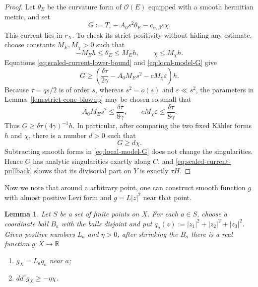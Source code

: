 \documentclass[reqno]{amsart}
\theoremstyle{remark}
\def\R{\mathbb{R}}
\newcommand{\ddc}{dd^c}
\newcommand{\cab}{c_{\alpha,\beta}}
\def\cO{{\mathcal O}}
\theoremstyle{plain}
\newtheorem{lemma}[thm]{Lemma}
\begin{document}
\begin{proof}
Let $\theta_E$ be the curvature form of $\cO(E)$ equipped with a smooth hermitian metric, and set
\begin{equation}\label{eq:local-model-G}
 G:=T_\tau-A_0s^2\theta_E-\cab\varepsilon\chi.
\end{equation}
This current lies in $r_X$.  To check its strict positivity without
hiding any estimate, choose constants $M_E,M_\chi>0$ such that
\[
 -M_Eh\leq\theta_E\leq M_Eh,
 \qquad
 \chi\leq M_\chi h.
\]
Equations \eqref{eq:scaled-current-lower-bound} and
\eqref{eq:local-model-G} give
\[
 G\geq
 \left(
  \frac{\delta\tau}{2\gamma}
  -A_0M_Es^2-cM_\chi\varepsilon
 \right)h.
\]
Because $\tau=qs/2$ is of order $s$, whereas
$s^2=o(s)$ and $\varepsilon\ll s^2$, the parameters in
Lemma~\ref{lem:strict-cone-blowup} may be chosen so small that
\[
 A_0M_Es^2\leq\frac{\delta\tau}{8\gamma},
 \qquad
 cM_\chi\varepsilon\leq\frac{\delta\tau}{8\gamma}.
\]
Thus $G\geq\delta\tau(4\gamma)^{-1}h$.  In particular, after
comparing the two fixed K\"ahler forms $h$ and $\chi$, there is a
number $d>0$ such that
\begin{equation}\label{eq:G-positive-lower-bound}
 G\geq d\chi.
\end{equation}
Subtracting smooth forms in \eqref{eq:local-model-G} does not change
the singularities.  Hence $G$ has analytic singularities
exactly along $C$, and \eqref{eq:scaled-current-pullback} shows that
its divisorial part on $Y$ is exactly $\tau H$.
\end{proof}


Now we note that around a arbitrary point, one can construct smooth function $g$ with almost positive Levi form and $g=L|z|^2$ near that point. 
\begin{lemma}
\label{lem:common-trace}
Let $S$ be a set of finite points on $X$. For each $a\in S$, choose a coordinate ball $B_a$ with the balls disjoint and put $q_a(z):=|z_1|^2+|z_2|^2+|z_3|^2.$ 
Given positive numbers $L_a$ and $\eta>0$, after shrinking
the $B_a$ there is a real function $g:X\to \R$
\begin{enumerate}[label=\textup{(\roman*)}]
\item $g_X=L_aq_a$ near $a$;
\item $\ddc g_X\geq-\eta\chi$.
\end{enumerate}
\end{lemma}
\end{document}
